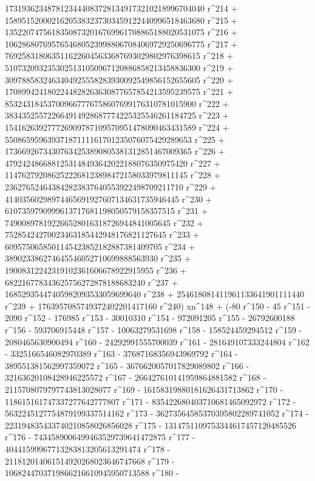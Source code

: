        17319362348781234440837281349173210218996704040 r^214 + 
       15895152000216205383237303459122440996518463680 r^215 + 
       13522074756183508732016769961708865188020531075 r^216 + 
       10628680769576546805239988067084069729250696775 r^217 + 
       7692583180635116226045633687693029802976398615 r^218 + 
       5107320932353025131050967120886858213458836300 r^219 + 
       3097885832463404925558283930092549856152655605 r^220 + 
       1708994241802244828263630877657854213595239575 r^221 + 
       853243184537009667776758607699176310781015900 r^222 + 
       383435255722664914928687774225325546261184725 r^223 + 
       154162639277726909787109570951478090463431589 r^224 + 
       55086595963937187111161701235076075429289653 r^225 + 
       17366926734307634253890805381312851467009365 r^226 + 
       4792424866881253148493642022188076350975420 r^227 + 
       1147627920862522268123898472158033979811145 r^228 + 
       236276524643842823837640553922498709211710 r^229 + 
       41403560298974465691927607134631735946445 r^230 + 
       6107359790999613717681198050579158357515 r^231 + 
       749008978192266528016318726944841005645 r^232 + 
       75285424270023463185442948176821127645 r^233 + 
       6095750658501145423852182887381409705 r^234 + 
       389023386274645546052710699888563930 r^235 + 
       19008312242319102361606678922915955 r^236 + 
       682216778343625756272878188683240 r^237 + 
       16852935447405982093533059699640 r^238 + 
       254618081411961133641901111440 r^239 + 
       1763957085749372402201417160 r^240) xn^148 + (-80 r^150 - 
       45 r^151 - 2090 r^152 - 176985 r^153 - 30010310 r^154 - 
       972091205 r^155 - 26792600188 r^156 - 593706915448 r^157 - 
       10063279531698 r^158 - 158524459294512 r^159 - 
       2080465630900494 r^160 - 24292991555700039 r^161 - 
       281649107333244804 r^162 - 3325166546082970389 r^163 - 
       37687168356943969792 r^164 - 389551381562997359072 r^165 - 
       3676620057017829089802 r^166 - 32163620108428946225572 r^167 - 
       266427610141959864881582 r^168 - 
       2115708079797743813028077 r^169 - 
       16158319880181626431713862 r^170 - 
       118615161747337277642777807 r^171 - 
       835422680403710681465092972 r^172 - 
       5632245127754879199337514162 r^173 - 
       36273564585370395802289741052 r^174 - 
       223194835433740210858026856028 r^175 - 
       1314751109753344617457120485526 r^176 - 
       7434589006499463529739641472875 r^177 - 
       40441599967713283813205613291474 r^178 - 
       211812014061514920268023646747668 r^179 - 
       1068244703719866216610945950713588 r^180 - 
